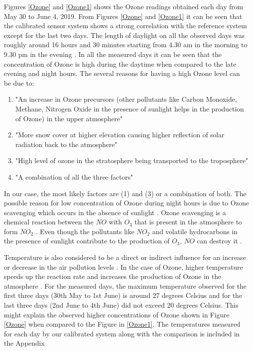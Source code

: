 Figures \ref{Ozone} and \ref{Ozone1} shows the Ozone readings obtained each day from May 30 to June 4, 2019. From Figures \ref{Ozone} and \ref{Ozone1} it can be seen that the calibrated sensor system shows a strong correlation with the reference system except for the last two days. The length of daylight on all the observed days was roughly around 16 hours and 30 minutes starting from 4.30 am in the morning to 9.30 pm in the evening \cite{daylight}. In all the measured days it can be seen that the concentration of Ozone is high during the daytime when compared to the late evening and night hours. The several reasons for having a high Ozone level can be due to:\cite{EnvironmentalQualitySectionMoE2012} 
\begin{enumerate}
  \item "An increase in Ozone precursors (other pollutants like Carbon Monoxide, Methane, Nitrogen Oxide in the presence of sunlight helps in the production of Ozone) in the upper atmosphere" 
  \item "More snow cover at higher elevation causing higher reflection of solar radiation back to the atmosphere" 
  \item "High level of ozone in the stratosphere being transported to the troposphere" 
  \item "A combination of all the three factors" 
\end{enumerate} 
 In our case,  the most likely factors are (1) and (3) or a combination of both. 
The possible reason for low concentration of Ozone during night hours is due to Ozone scavenging which occurs in the absence of sunlight \cite{EnvironmentalQualitySectionMoE2012}. Ozone scavenging is a chemical reaction between the ${NO}$ with ${O_3}$ that is present in the atmosphere to form ${NO_2}$ \cite{airqualityontario}. Even though the pollutants like ${NO_2}$ and volatile hydrocarbons in the presence of sunlight contribute to the production of ${O_3}$, ${NO}$ can destroy it \cite{airqualityontario} \cite{EnvironmentalQualitySectionMoE2012}.

 
Temperature is also considered to be a direct or indirect influence for an increase or decrease in the air pollution levels \cite{EnvironmentalQualitySectionMoE2012}. In the case of Ozone, higher temperature speeds up the reaction rate and increases the production of Ozone in the atmosphere \cite{coates2016influence}. For the measured days, the maximum temperature observed for the first three days (30th May to 1st June) is around 27 degrees Celsius and for the last three days (2nd June to 4th June) did not exceed 20 degrees Celsius. This might explain the observed higher concentrations of Ozone shown in Figure \ref{Ozone} when compared to the Figure in \ref{Ozone1}. The temperatures measured for each day by our calibrated system along with the comparison is included in the Appendix 



